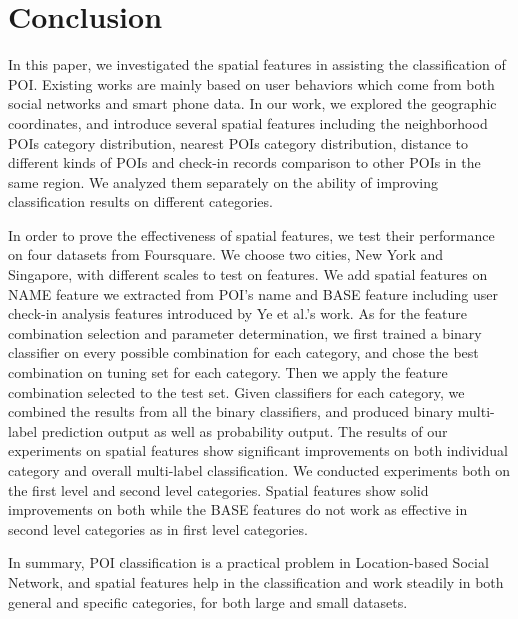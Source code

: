 \section{Conclusion}

In this paper, we investigated the spatial features in 
assisting the classification of POI. Existing works are mainly 
based on user behaviors which come from both social networks 
and smart phone data. In our work, we explored the geographic coordinates, 
and introduce several spatial features including the neighborhood POIs 
category distribution, nearest POIs category distribution, 
distance to different kinds of POIs and check-in records 
comparison to other POIs in the same region. We analyzed 
them separately on the ability of improving 
classification results on different categories.

In order to prove the effectiveness of spatial features, 
we test their performance on four datasets from Foursquare. 
We choose two cities, New York and Singapore, with different 
scales to test on features. We add spatial features on NAME feature 
we extracted from POI's name and BASE feature including user check-in 
analysis features introduced by Ye et al.'s work. As for the 
feature combination selection and parameter determination, 
we first trained a binary classifier on every possible combination 
for each category, and chose the best combination on tuning set 
for each category. Then we apply the feature combination selected 
to the test set. Given classifiers for each category, we combined 
the results from all the binary classifiers, and produced binary 
multi-label prediction output as well as probability output. 
The results of our experiments on spatial features show significant 
improvements on both individual category and overall multi-label classification. 
We conducted experiments both on the first level and second level categories. 
Spatial features show solid improvements on both 
while the BASE features do not work as effective in 
second level categories as in first level categories.

In summary, POI classification is a practical problem in Location-based Social Network, 
and spatial features help in the classification and work steadily in both general 
and specific categories, for both large and small datasets.
